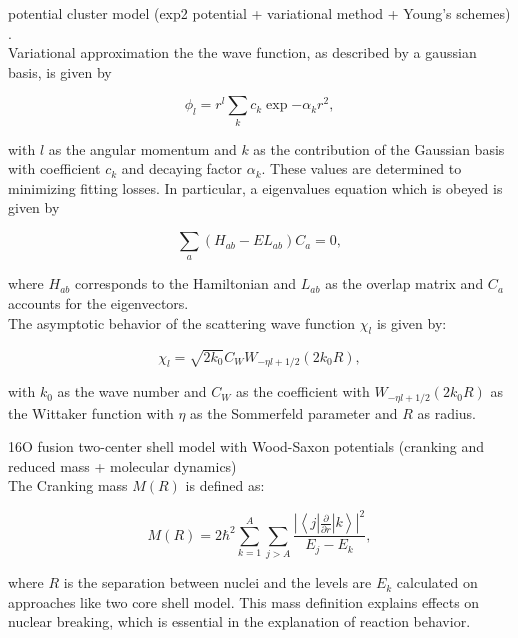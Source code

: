 \documentclass[openany]{book}
\begin{document}
potential cluster model (exp2 potential + variational method + Young's schemes)
\cite{dubovichenko_2012}. \\

Variational approximation the the wave function, as described by a gaussian basis, is given by

\begin{equation}\label{eq:potential_variational_basis}
	\phi_l = r^l \sum_{k}  c_k \exp{-\alpha_k r^2},
 \end{equation}

with $l$ as the angular momentum and $k$ as the contribution of the Gaussian basis with coefficient $c_k$ and decaying factor $\alpha_k$. These values are determined to minimizing fitting losses. In particular, a eigenvalues equation which is obeyed is given by


\begin{equation}\label{eq:potential_variational_eigenvalues}
	\sum_{a} (H_{ab} - E L_{ab})C_a = 0,
\end{equation}

where $H_{ab}$ corresponds to the Hamiltonian and $L_{ab}$ as the overlap matrix and $C_a$ accounts for the eigenvectors.  \\

The asymptotic behavior of the scattering wave function $\chi_l$ is given by:


\begin{equation}\label{eq:potential_variational_scattering}
	\chi_l = \sqrt{2k_0} C_W W_{-\eta l + 1/2}(2k_0R),
\end{equation}

with $k_0$ as the wave number and $C_W$ as the coefficient with $ W_{-\eta l + 1/2}(2k_0R)$ as the Wittaker function with $\eta$ as the Sommerfeld parameter and $R$ as radius. 


16O fusion two-center shell model with Wood-Saxon potentials (cranking and reduced mass + molecular dynamics) \cite{diaz-torres_gasques_wiescher_2007} \\

The Cranking mass $M(R)$ is defined as: 

\begin{equation}\label{potential_crankingMass}
	M(R) = 2 \hbar^2 \sum_{k=1}^{A} \sum_{j > A} \frac{\left|\left \langle j | \frac{\partial}{\partial r} | k \right \rangle \right|^2}{E_j - E_k},
\end{equation}

where $R$ is the separation between nuclei and the levels are $E_k$ calculated on approaches like two core shell model. This mass definition explains effects on nuclear breaking, which is essential in the explanation of reaction behavior.
\end{document}
